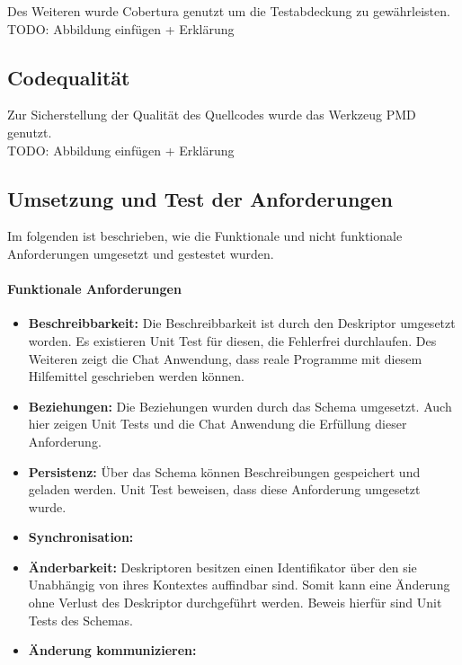 \documentclass[a4paper]{article}
\begin{document}
	Des Weiteren wurde Cobertura genutzt um die Testabdeckung zu gewährleisten. \\
	
  	TODO: Abbildung einfügen + Erklärung
	
	\subsection{Codequalität}
	\label{sec:pmd}
	
	Zur Sicherstellung der Qualität des Quellcodes wurde das Werkzeug PMD genutzt. \\
	
	TODO: Abbildung einfügen + Erklärung
	
	\subsection{Umsetzung und Test der Anforderungen }
	Im folgenden ist beschrieben, wie die Funktionale und nicht funktionale
	Anforderungen umgesetzt und gestestet wurden.
	
	\paragraph{Funktionale Anforderungen}
	\begin{itemize}
		\item \textbf{Beschreibbarkeit:} Die Beschreibbarkeit ist durch den
		Deskriptor umgesetzt worden. Es existieren Unit Test
		für diesen, die Fehlerfrei durchlaufen. Des Weiteren zeigt die Chat
		Anwendung, dass reale Programme mit diesem Hilfemittel geschrieben werden
		können.
		\item \textbf{Beziehungen:} Die Beziehungen wurden durch das Schema
		umgesetzt. Auch hier zeigen Unit Tests und die Chat Anwendung die Erfüllung
		dieser Anforderung.
		\item \textbf{Persistenz:} Über das Schema können Beschreibungen gespeichert
		und geladen werden. Unit Test beweisen, dass diese Anforderung umgesetzt
		wurde.
		\item \textbf{Synchronisation:} 
		\item \textbf{Änderbarkeit:} Deskriptoren besitzen einen Identifikator über
		den sie Unabhängig von ihres Kontextes auffindbar sind. Somit kann
		eine Änderung ohne Verlust des Deskriptor durchgeführt werden. Beweis hierfür
		sind Unit Tests des Schemas.
		\item \textbf{Änderung kommunizieren:}
	\end{itemize} 	
	
\end{document}
